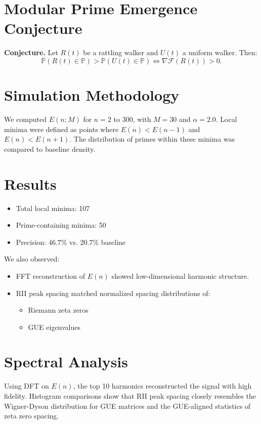 \documentclass[12pt]{article}
\begin{document}
\section{Modular Prime Emergence Conjecture}
\textbf{Conjecture.}
Let \(R(t)\) be a rattling walker and \(U(t)\) a uniform walker. Then:
\[
\mathbb{P}(R(t) \in \mathbb{P}) > \mathbb{P}(U(t) \in \mathbb{P}) \iff \nabla \mathcal{F}(R(t)) > 0.
\]

\section{Simulation Methodology}
We computed \(E(n;M)\) for \(n = 2\) to \(300\), with \(M = 30\) and \(\alpha = 2.0\). Local minima were defined as points where \(E(n) < E(n-1)\) and \(E(n) < E(n+1)\). The distribution of primes within these minima was compared to baseline density.

\section{Results}
\begin{itemize}
\item Total local minima: 107
\item Prime-containing minima: 50
\item Precision: 46.7\% vs. 20.7\% baseline
\end{itemize}

We also observed:
\begin{itemize}
\item FFT reconstruction of \(E(n)\) showed low-dimensional harmonic structure.
\item RII peak spacing matched normalized spacing distributions of:
  \begin{itemize}
  \item Riemann zeta zeros
  \item GUE eigenvalues
  \end{itemize}
\end{itemize}

\section{Spectral Analysis}
Using DFT on \(E(n)\), the top 10 harmonics reconstructed the signal with high fidelity. Histogram comparisons show that RII peak spacing closely resembles the Wigner-Dyson distribution for GUE matrices and the GUE-aligned statistics of zeta zero spacing.
\end{document}
